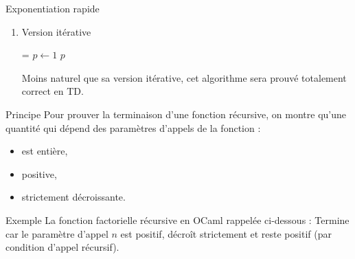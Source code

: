 \documentclass[10pt]{beamer}
\begin{document}
\begin{frame}[fragile]{\Ctitle}{\stitle}
	\begin{exampleblock}{Exponentiation rapide}
		\begin{enumerate}
			\addtocounter{enumi}{5}
			\item<1-> \textcolor{OliveGreen}{Version itérative}
			\begin{algorithm}[H]
				\DontPrintSemicolon
				\caption{Version itérative de l'exponentiation rapide}
				\everypar={\footnotesize \textcolor{gray}{\nl}}
				$p \leftarrow 1$\;
				\Return $p$
			  \end{algorithm}	
		Moins \og{} naturel \fg{} que sa version itérative, cet algorithme sera prouvé totalement correct en TD.
		\end{enumerate}
	\end{exampleblock}
\end{frame}

\begin{frame}[fragile]{\Ctitle}{\stitle}
	\begin{block}{Principe}
		Pour prouver la terminaison d'une fonction récursive, on montre qu'une quantité qui dépend des paramètres d'appels de la fonction :
		\begin{itemize}
		\item<2-> est entière,
		\item<3-> positive,
		\item<4-> strictement décroissante.
		\end{itemize}
	\end{block}
	{
		\begin{exampleblock}{Exemple}
			La fonction factorielle récursive en OCaml rappelée ci-dessous :
			Termine car le paramètre d'appel $n$ est positif, décroît strictement et reste positif (par condition d'appel récursif).
		\end{exampleblock}
	}
\end{frame}
\end{document}
